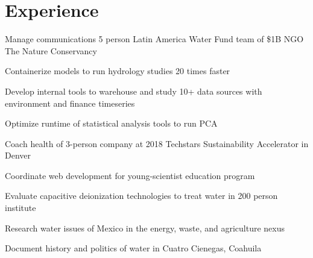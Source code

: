 \documentclass[letterpaper]{deedy-resume} %
\begin{document}
\begin{minipage}[t]{0.66\textwidth} %


\section{Experience}


\vspace{\topsep} %
\begin{tightitemize}
    \item Manage communications 5 person Latin America Water Fund team of \$1B NGO The Nature Conservancy
    \item Containerize models to run hydrology studies 20 times faster
    \item Develop internal tools to warehouse and study 10+ data sources with environment and finance timeseries
    \item Optimize runtime of statistical analysis tools to run PCA
    \item Coach health of 3-person company at 2018 Techstars Sustainability Accelerator in Denver
\end{tightitemize}

\sectionspace %



\begin{tightitemize}
    \item Coordinate web development for young-scientist education program
    \item Evaluate capacitive deionization technologies to treat water in 200 person institute
    \item Research water issues of Mexico in the energy, waste, and agriculture nexus
    \item Document history and politics of water in Cuatro Cienegas, Coahuila

\end{tightitemize}


\end{minipage}
\end{document}

